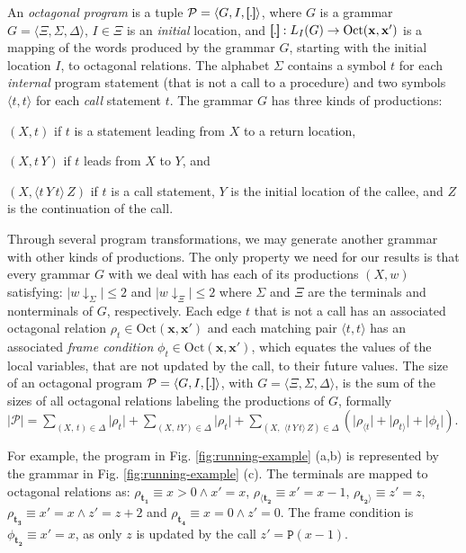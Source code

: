 \documentclass[final]{llncs}
\newcommand{\rbr}{{\bf ]\!\!]}}
\newcommand{\lbr}{{\bf [\!\![}}
\newcommand{\sem}[1]{\lbr #1 \rbr}
\renewcommand{\vec}[1]{{\bf {#1}}}
\def\tuple#1{{\langle #1 \rangle}}
\def\len#1{{\vert{#1}\vert}}
\def\prod{\Delta}
\def\Vars{\ensuremath{\Xi}}
\renewcommand{\vec}[1]{{\mathbf {#1}}}
\def\proj{\mathbin{\downarrow}}
\renewcommand{\proj}[2]{{#1}\mathclose{\downarrow}_{{#2}}}
\begin{document}
An \emph{octagonal program} is a tuple
\(\mathcal{P}=\tuple{G,I,\sem{.}}\), where \(G\) is a grammar
\(G=\tuple{\Vars,\Sigma,\prod}\), \(I\in\Vars\) is an \emph{initial} 
location, and \(\sem{.} :
L_I(G) \rightarrow \mathrm{Oct}(\vec{x},\vec{x}')\) is a mapping of
the words produced by the grammar \(G\), starting with the initial
location \(I\), to octagonal relations.  The alphabet \(\Sigma\)
contains a symbol \(t\) for each \emph{internal} program statement
(that is not a call to a procedure) and two symbols \(\langle\!t,
t\!\rangle\) for each \emph{call} statement \(t\). The grammar \(G\)
has three kinds of productions: \begin{inparaenum}
\item \((X,t)\) if \(t\) is a statement leading from \(X\) to a return location, 
\item \((X,t\, Y)\) if \(t\) leads from \(X\) to \(Y\), and 
\item \((X,\langle\!t \, Y \, t\!\rangle \, Z)\) if \(t\) is a call statement, 
\(Y\) is the initial location of the callee, and \(Z\) is the continuation of the call.
\end{inparaenum}
Through several program transformations, we may generate another
grammar with other kinds of productions. 
The only property we need for our results is that every grammar \(G\)
with we deal with has each of its productions \( (X,w) \) satisfying:
\(\len{\proj{w}{\Sigma}}\leq 2\) and \(\len{\proj{w}{\Vars}}\leq 2\)
where \(\Sigma\) and \(\Vars\) are the terminals and nonterminals of \(G\), respectively.
Each edge \(t\) that is not a call has an associated octagonal
relation \(\rho_t\in\mathrm{Oct}(\vec{x},\vec{x}')\) and each matching
pair \(\langle\!t, t\!\rangle\) has an associated \emph{frame
condition} \(\phi_t\in\mathrm{Oct}(\vec{x},\vec{x}')\), which equates
the values of the local variables, that are not updated by the call,
to their future values. The size of an octagonal program \(\mathcal{P}
= \tuple{G,I,\sem{.}}\), with \(G=\tuple{\Vars,\Sigma,\prod}\), is the
sum of the sizes of all octagonal relations labeling the productions
of \(G\), formally \(\len{\mathcal{P}}
= \sum_{(X,\, t) \in \prod} \len{\rho_t}
+ \sum_{(X,\, tY) \in \prod} \len{\rho_t} 
+ \sum_{(X,\, \, \langle\!t\, Y\, t\!\rangle\, Z) \in \prod} 
(\len{\rho_{\langle\!t}} + \len{\rho_{t\!\rangle}} + \len{\phi_t})\).

For example, the program in Fig. \ref{fig:running-example} (a,b) is
represented by the grammar in Fig. \ref{fig:running-example} (c).  The
terminals are mapped to octagonal relations
as: \(\rho_{\mathbf{t_1}} \equiv x>0 \wedge
x'=x\), \(\rho_{\langle\!\mathbf{t_2}} \equiv
x'=x-1\), \(\rho_{\mathbf{t_2}\!\rangle} \equiv
z'=z\), \(\rho_{\mathbf{t_3}} \equiv x'=x \wedge z'=z+2\)
and \(\rho_{\mathbf{t_4}} \equiv x=0 \wedge z'=0\). The frame
condition is \(\phi_{\mathbf{t_2}} \equiv x'=x\), as only \(z\) is
updated by the call \(z'=\mathtt{P}(x-1)\).
\end{document}
